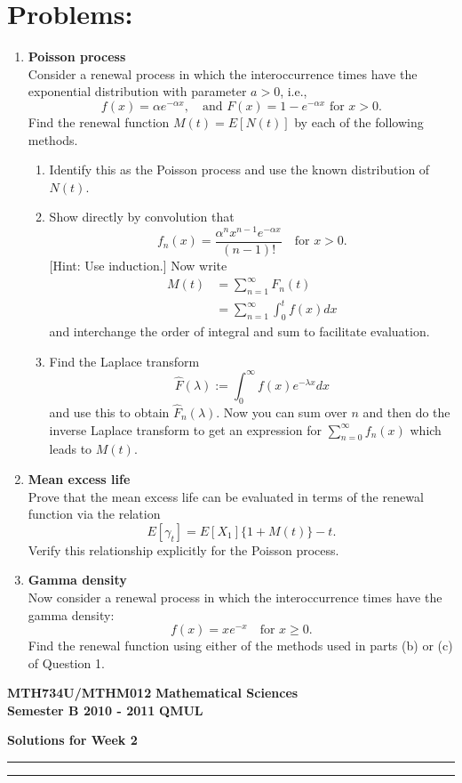 \documentclass[11pt,a4paper]{article}
\begin{document}
  \section*{Problems:}
  \begin{enumerate}
    \item \textbf{Poisson process}\\
    Consider a renewal process in which the interoccurrence times have the exponential distribution with parameter $a > 0$, i.e.,
    $$
    f(x) = \alpha e^{-\alpha x},\quad \text{and $F(x) = 1 - e^{-\alpha x}$ for $x > 0$}.
    $$
    Find the renewal function $M(t) = E[N(t)]$ by each of the following methods.
    \begin{enumerate}
      \item Identify this as the Poisson process and use the known distribution of $N(t)$.
      \item Show directly by convolution that
      $$
      f_n(x) = \frac{\alpha^nx^{n - 1}e^{-\alpha x}}{(n - 1)!}\quad \text{for $x > 0$}.
      $$
      [Hint: Use induction.] Now write
      \begin{align*}
        M(t)
        &= \sum_{n = 1}^\infty F_n(t)\\
        &= \sum_{n = 1}^\infty\int_0^tf(x)dx
      \end{align*}
      and interchange the order of integral and sum to facilitate evaluation.
      \item Find the Laplace transform
      $$
      \hat{F}(\lambda):=\int_0^\infty f(x)e^{-\lambda x}dx
      $$
      and use this to obtain $\hat{F}_n(\lambda)$. Now you can sum over $n$ and then do the inverse Laplace transform to get an expression for $\sum_{n = 0}^\infty f_n(x)$ which leads to $M(t)$.
    \end{enumerate}
    \item \textbf{Mean excess life}\\
    Prove that the mean excess life can be evaluated in terms of the renewal function via the relation
    $$
    E[\gamma_t] = E[X_1]\{1 + M(t)\} - t.
    $$
    Verify this relationship explicitly for the Poisson process.
    \item \textbf{Gamma density}\\
    Now consider a renewal process in which the interoccurrence times have the gamma density:
    $$
    f(x) = xe^{-x}\quad\text{for $x \geq 0$}.
    $$
    Find the renewal function using either of the methods used in parts (b) or (c) of Question 1.
  \end{enumerate}
  \newpage
  \textbf{MTH734U/MTHM012} \hfill \textbf{Mathematical Sciences}\\
  \textbf{Semester B 2010 - 2011} \hfill \textbf{QMUL}
  \begin{center}
    \textbf{\huge Solutions for Week 2}
  \end{center}
  \hrule \vspace{2mm} \hrule
\end{document}
